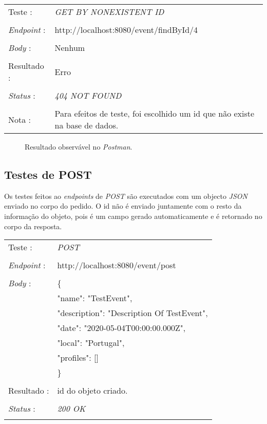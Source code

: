 \begin{tabular}{ll}
	Teste : & \emph{GET BY NONEXISTENT ID}\\
	\\
	\emph{Endpoint} : & http://localhost:8080/event/findById/4\\
	\\
	\emph{Body} : & Nenhum\\
	\\
	Resultado : & Erro\\
	\\
	\emph{Status} : & \emph{404 NOT FOUND}\\
	\\
	Nota : & Para efeitos de teste, foi escolhido um id que não existe na base de dados.\\
\end{tabular}

\begin{figure}[h]
	\begin{center}
	\end{center}
	\caption{Resultado observável no \emph{Postman}.}\label{fig:eventfindbyid404}
\end{figure}
\newpage

\subsection{Testes de POST}\label{512}
Os testes feitos ao \emph{endpoints} de \emph{POST} são executados com um objecto \emph{JSON} enviado no corpo do pedido. O id não é enviado juntamente com o resto da informação do objeto, pois é um campo gerado automaticamente e é retornado no corpo da resposta.
\\
\begin{tabular}{ll}
	Teste : & \emph{POST}\\
	\\
	\emph{Endpoint} : & http://localhost:8080/event/post\\
	\\
	\emph{Body} : & \{ \\
				  &	"name": "TestEvent",\\
				  & "description": "Description Of TestEvent",\\
				  & "date": "2020-05-04T00:00:00.000Z",\\
				  & "local": "Portugal",\\
				  & "profiles": []\\
				  & \} \\
	\\
	Resultado : & id do objeto criado.\\
	\\
	\emph{Status} : & \emph{200 OK}\\
	\\
\end{tabular}

